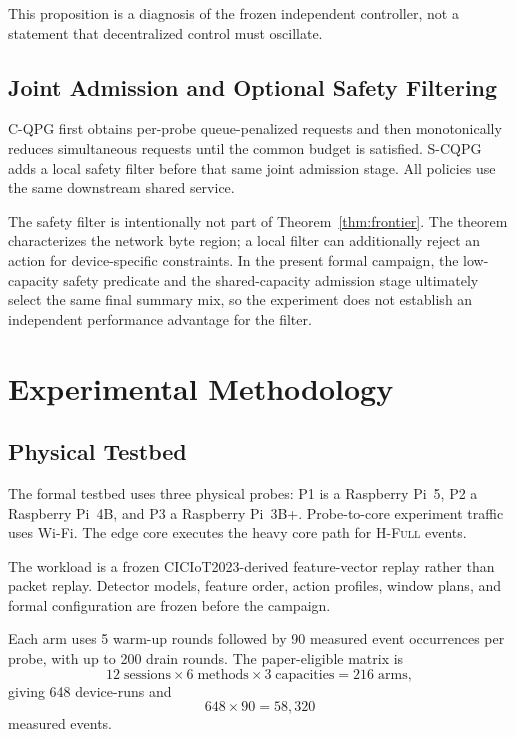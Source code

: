 \documentclass[10pt,journal]{IEEEtran}
\newcommand{\Hfull}{\textsc{H-Full}}
\newcommand{\CQPG}{\textsc{C-QPG}}
\newcommand{\SCQPG}{\textsc{S-CQPG}}
\begin{document}
This proposition is a diagnosis of the frozen independent controller,
not a statement that decentralized control must oscillate.

\subsection{Joint Admission and Optional Safety Filtering}

\CQPG{} first obtains per-probe queue-penalized requests and then
monotonically reduces simultaneous requests until the common budget is
satisfied. \SCQPG{} adds a local safety filter before that same joint
admission stage. All policies use the same downstream shared service.

The safety filter is intentionally not part of
Theorem~\ref{thm:frontier}. The theorem characterizes the network byte
region; a local filter can additionally reject an action for
device-specific constraints. In the present formal campaign, the
low-capacity safety predicate and the shared-capacity admission stage
ultimately select the same final summary mix, so the experiment does
not establish an independent performance advantage for the filter.

\section{Experimental Methodology}
\label{sec:method}

\subsection{Physical Testbed}

The formal testbed uses three physical probes:
P1 is a Raspberry Pi~5, P2 a Raspberry Pi~4B, and P3 a Raspberry
Pi~3B+. Probe-to-core experiment traffic uses Wi-Fi. The edge core
executes the heavy core path for \Hfull{} events.

The workload is a frozen CICIoT2023-derived feature-vector replay rather
than packet replay. Detector models, feature order, action profiles,
window plans, and formal configuration are frozen before the campaign.

Each arm uses 5 warm-up rounds followed by 90 measured event occurrences
per probe, with up to 200 drain rounds. The paper-eligible matrix is
\[
12\;\text{sessions}
\times
6\;\text{methods}
\times
3\;\text{capacities}
=
216\;\text{arms},
\]
giving 648 device-runs and
\[
648\times90=58,320
\]
measured events.
\end{document}
